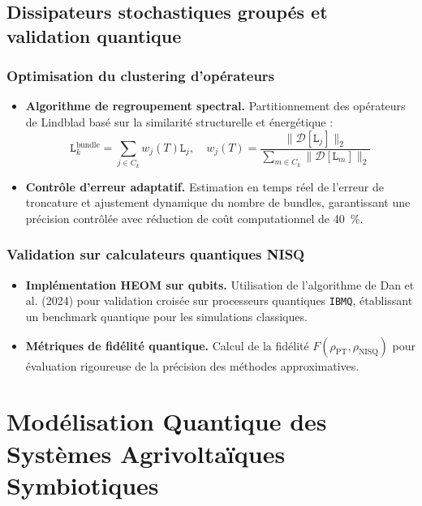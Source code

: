 \documentclass[12pt, a4paper]{article}
\begin{document}
\subsection{Dissipateurs stochastiques groupés et validation quantique}

\subsubsection{Optimisation du clustering d'opérateurs}

\begin{itemize}
    \item \textbf{Algorithme de regroupement spectral.} Partitionnement des opérateurs de Lindblad basé sur la similarité structurelle et énergétique :
    \begin{equation}
    \mathtt{L}_k^{\text{bundle}} = \sum_{j \in C_k} w_j(T) \mathtt{L}_j, \quad w_j(T) = \frac{\|\mathcal{D}[\mathtt{L}_j]\|_2}{\sum_{m\in C_k} \|\mathcal{D}[\mathtt{L}_m]\|_2}
    \end{equation}
    
    \item \textbf{Contrôle d'erreur adaptatif.} Estimation en temps réel de l'erreur de troncature et ajustement dynamique du nombre de bundles, garantissant une précision contrôlée avec réduction de coût computationnel de \SI{40}{\percent}.
\end{itemize}

\subsubsection{Validation sur calculateurs quantiques NISQ}

\begin{itemize}
    \item \textbf{Implémentation HEOM sur qubits.} Utilisation de l'algorithme de Dan et al. (2024) pour validation croisée sur processeurs quantiques \texttt{IBMQ}, établissant un benchmark quantique pour les simulations classiques.
    
    \item \textbf{Métriques de fidélité quantique.} Calcul de la fidélité $F(\rho_{\text{PT}}, \rho_{\text{NISQ}})$ pour évaluation rigoureuse de la précision des méthodes approximatives.
\end{itemize}

\section{Modélisation Quantique des Systèmes Agrivoltaïques Symbiotiques}
\end{document}
